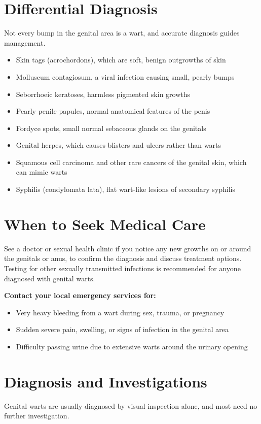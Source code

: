 \section*{Differential Diagnosis}
Not every bump in the genital area is a wart, and accurate diagnosis guides management.

\begin{itemize}
    \item Skin tags (acrochordons), which are soft, benign outgrowths of skin
    \item Molluscum contagiosum, a viral infection causing small, pearly bumps
    \item Seborrhoeic keratoses, harmless pigmented skin growths
    \item Pearly penile papules, normal anatomical features of the penis
    \item Fordyce spots, small normal sebaceous glands on the genitals
    \item Genital herpes, which causes blisters and ulcers rather than warts
    \item Squamous cell carcinoma and other rare cancers of the genital skin, which can mimic warts
    \item Syphilis (condylomata lata), flat wart-like lesions of secondary syphilis
\end{itemize}

\section*{When to Seek Medical Care}
See a doctor or sexual health clinic if you notice any new growths on or around the genitals or anus, to confirm the diagnosis and discuss treatment options. Testing for other sexually transmitted infections is recommended for anyone diagnosed with genital warts.

\textbf{Contact your local emergency services for:}
\begin{itemize}
    \item Very heavy bleeding from a wart during sex, trauma, or pregnancy
    \item Sudden severe pain, swelling, or signs of infection in the genital area
    \item Difficulty passing urine due to extensive warts around the urinary opening
\end{itemize}

\section*{Diagnosis and Investigations}
Genital warts are usually diagnosed by visual inspection alone, and most need no further investigation.

